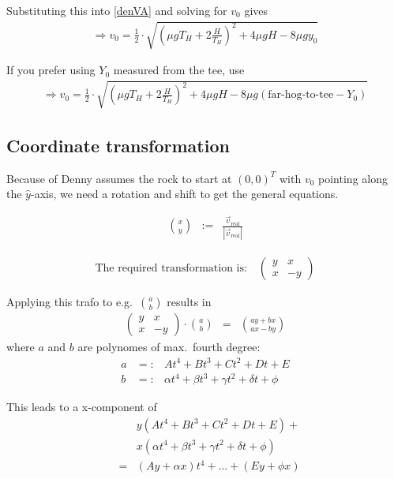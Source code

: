 Substituting this into \eqref{denVA} and solving for $v_0$ gives
\begin{eqnarray}
\Longrightarrow v_0 =  \frac{1}{2}\cdot 
    \sqrt{
	\left(\mu g T_H + 2\frac{H}{T_H}\right)^2 +
	4 \mu g H - 
	8 \mu g y_0
    }
\end{eqnarray}

If you prefer using $Y_0$ measured from the tee, use
\begin{eqnarray}
\Longrightarrow v_0 =  \frac{1}{2}\cdot 
    \sqrt{
	\left(\mu g T_H + 2\frac{H}{T_H}\right)^2 + 
	4 \mu g H - 
	8 \mu g (\mbox{far-hog-to-tee} - Y_0)
    }
\end{eqnarray}

\subsection{Coordinate transformation}

Because of Denny assumes the rock to start at
$(0,0)^T$ with $v_0$ pointing along the $\hat{y}$-axis, we need a
rotation and shift to get the general equations.

\begin{eqnarray}
{x \choose y} &:=& \frac{ \vec{v}_\mathrm{real} }{ | \vec{v}_\mathrm{real} | }
\end{eqnarray}

\begin{eqnarray}
\mbox{The required transformation is:}\quad
\left(\begin{array}{cc}
 y &  x \\
 x & -y
\end{array}\right)
\end{eqnarray}

Applying this trafo to e.g.\ ${a \choose b}$ results in
\begin{eqnarray}
\left(\begin{array}{cc}
 y &  x \\
 x & -y
\end{array}\right)
\cdot {a \choose b} &=&
{ay+bx \choose ax-by}
\end{eqnarray}
%
where $a$ and $b$ are polynomes of max.\ fourth degree:
%
\begin{eqnarray}
a &=:& At^4 + Bt^3 + Ct^2 + Dt + E \\
b &=:& \alpha t^4 + \beta t^3 + \gamma t^2 + \delta t + \phi
\end{eqnarray}

This leads to a x-component of
\begin{eqnarray}
&& y ( At^4 + Bt^3 + Ct^2 + Dt + E ) + \nonumber \\
&& x ( \alpha t^4 + \beta t^3 + \gamma t^2 + \delta t + \phi ) \\
&=& (Ay + \alpha x)t^4 + \ldots + (Ey + \phi x)
\end{eqnarray}

